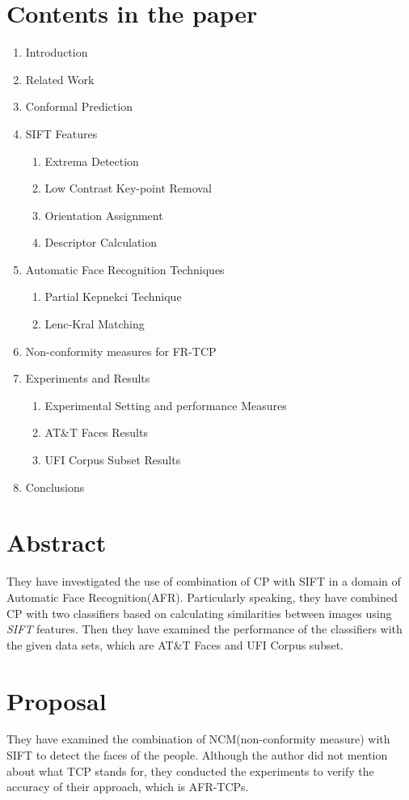 \documentclass[10pt,a4paper]{article}
\begin{document}
\section{Contents in the paper}
\begin{enumerate}
\item Introduction
\item Related Work
\item Conformal Prediction
\item SIFT Features
    \begin{enumerate}
        \item Extrema Detection
        \item Low Contrast Key-point Removal
        \item Orientation Assignment
        \item Descriptor Calculation
    \end{enumerate}
\item Automatic Face Recognition Techniques
    \begin{enumerate}
        \item Partial Kepnekci Technique
        \item Lenc-Kral Matching
    \end{enumerate}
\item Non-conformity measures for FR-TCP
\item Experiments and Results
    \begin{enumerate}
        \item Experimental Setting and performance Measures
        \item AT&T Faces Results
        \item UFI Corpus Subset Results
    \end{enumerate}
\item Conclusions
\end{enumerate}

\section{Abstract}
They have investigated the use of combination of CP with SIFT in a domain of Automatic Face Recognition(AFR). Particularly speaking, they have combined CP with two classifiers based on calculating similarities between images using \textit{SIFT} features. Then they have examined the performance of the classifiers with the given data sets, which are AT&T Faces and UFI Corpus subset.

\section{Proposal}
They have examined the combination of NCM(non-conformity measure) with SIFT to detect the faces of the people. Although the author did not mention about what TCP stands for, they conducted the experiments to verify the accuracy of their approach, which is AFR-TCPs.
\end{document}
